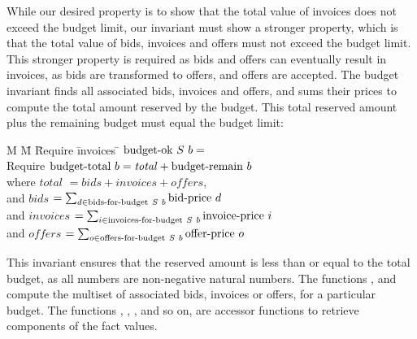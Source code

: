 While our desired property is to show that the total value of invoices does not exceed the budget limit, our invariant must show a stronger property, which is that the total value of bids, invoices and offers must not exceed the budget limit.
This stronger property is required as bids and offers can eventually result in invoices, as bids are transformed to offers, and offers are accepted.
The budget invariant finds all associated bids, invoices and offers, and sums their prices to compute the total amount reserved by the budget.
This total reserved amount plus the remaining budget must equal the budget limit:

\begin{tabbing}
M \= M \= Require \= invoices \= \kill
\> $\textrm{budget-ok}~{S}~b = $ \\
\> \> Require \> $\textrm{budget-total}~b = \mathit{total} + \textrm{budget-remain}~b$ \\
\> \> where   \> $\mathit{total}$       \> $= \mathit{bids} + \mathit{invoices} + \mathit{offers}$, \\
\> \> and     \> $\mathit{bids}$        \> $= \sum_{d \in \textrm{bids-for-budget}~S~b} \textrm{bid-price}~d$ \\
\> \> and     \> $\mathit{invoices}$    \> $= \sum_{i \in \textrm{invoices-for-budget}~S~b} \textrm{invoice-price}~i$ \\
\> \> and     \> $\mathit{offers}$      \> $= \sum_{o \in \textrm{offers-for-budget}~S~b} \textrm{offer-price}~o$ \\
\end{tabbing}

This invariant ensures that the reserved amount is less than or equal to the total budget, as all numbers are non-negative natural numbers.
The functions ,  and  compute the multiset of associated bids, invoices or offers, for a particular budget.
The functions , , , and so on, are accessor functions to retrieve components of the fact values.
